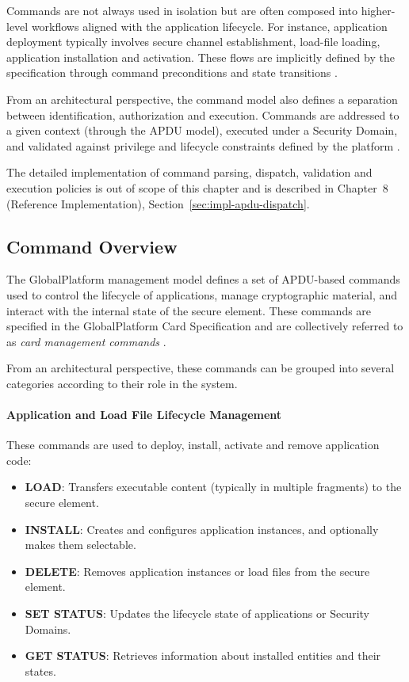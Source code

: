 Commands are not always used in isolation but are often composed into
higher-level workflows aligned with the application lifecycle. For instance,
application deployment typically involves secure channel establishment,
load-file loading, application installation and activation. These flows are implicitly
defined by the specification through command preconditions and state
transitions .

From an architectural perspective, the command model also defines a separation
between identification, authorization and execution. Commands are addressed to
a given context (through the APDU model), executed under a Security Domain, and
validated against privilege and lifecycle constraints defined by the platform
.

The detailed implementation of command parsing, dispatch, validation and
execution policies is out of scope of this chapter and is described in
Chapter~8 (Reference Implementation), Section~\ref{sec:impl-apdu-dispatch}.

\subsection{Command Overview}

The GlobalPlatform management model defines a set of APDU-based commands
used to control the lifecycle of applications, manage cryptographic material,
and interact with the internal state of the secure element. These commands are
specified in the GlobalPlatform Card Specification and are collectively
referred to as \emph{card management commands} .

From an architectural perspective, these commands can be grouped into several
categories according to their role in the system.

\paragraph{Application and Load File Lifecycle Management}

These commands are used to deploy, install, activate and remove application
code:

\begin{itemize}
\item \textbf{LOAD}: Transfers executable content (typically in multiple
    fragments) to the secure element.
\item \textbf{INSTALL}: Creates and configures application instances, and
    optionally makes them selectable.
\item \textbf{DELETE}: Removes application instances or load files from the secure
    element.
\item \textbf{SET STATUS}: Updates the lifecycle state of applications or
    Security Domains.
\item \textbf{GET STATUS}: Retrieves information about installed entities and
    their states.
\end{itemize}

